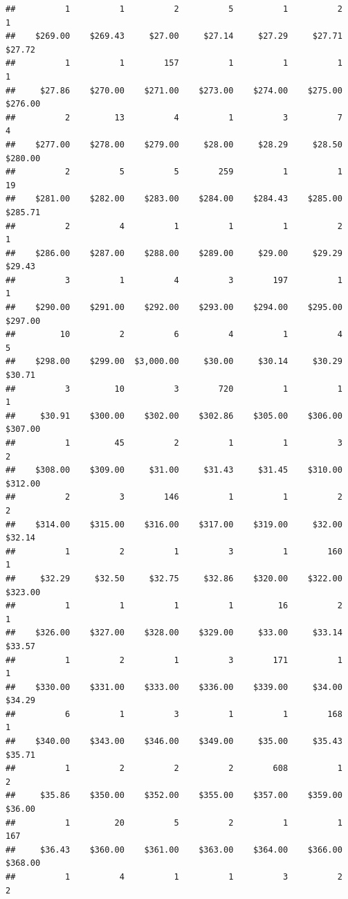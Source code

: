 \begin{verbatim}
##          1          1          2          5          1          2          1 
##    $269.00    $269.43     $27.00     $27.14     $27.29     $27.71     $27.72 
##          1          1        157          1          1          1          1 
##     $27.86    $270.00    $271.00    $273.00    $274.00    $275.00    $276.00 
##          2         13          4          1          3          7          4 
##    $277.00    $278.00    $279.00     $28.00     $28.29     $28.50    $280.00 
##          2          5          5        259          1          1         19 
##    $281.00    $282.00    $283.00    $284.00    $284.43    $285.00    $285.71 
##          2          4          1          1          1          2          1 
##    $286.00    $287.00    $288.00    $289.00     $29.00     $29.29     $29.43 
##          3          1          4          3        197          1          1 
##    $290.00    $291.00    $292.00    $293.00    $294.00    $295.00    $297.00 
##         10          2          6          4          1          4          5 
##    $298.00    $299.00  $3,000.00     $30.00     $30.14     $30.29     $30.71 
##          3         10          3        720          1          1          1 
##     $30.91    $300.00    $302.00    $302.86    $305.00    $306.00    $307.00 
##          1         45          2          1          1          3          2 
##    $308.00    $309.00     $31.00     $31.43     $31.45    $310.00    $312.00 
##          2          3        146          1          1          2          2 
##    $314.00    $315.00    $316.00    $317.00    $319.00     $32.00     $32.14 
##          1          2          1          3          1        160          1 
##     $32.29     $32.50     $32.75     $32.86    $320.00    $322.00    $323.00 
##          1          1          1          1         16          2          1 
##    $326.00    $327.00    $328.00    $329.00     $33.00     $33.14     $33.57 
##          1          2          1          3        171          1          1 
##    $330.00    $331.00    $333.00    $336.00    $339.00     $34.00     $34.29 
##          6          1          3          1          1        168          1 
##    $340.00    $343.00    $346.00    $349.00     $35.00     $35.43     $35.71 
##          1          2          2          2        608          1          2 
##     $35.86    $350.00    $352.00    $355.00    $357.00    $359.00     $36.00 
##          1         20          5          2          1          1        167 
##     $36.43    $360.00    $361.00    $363.00    $364.00    $366.00    $368.00 
##          1          4          1          1          3          2          2 

\end{verbatim}

